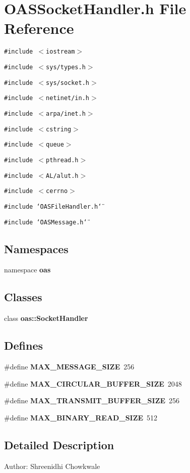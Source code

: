 \section{OASSocket\-Handler.h File Reference}
\label{OASSocketHandler_8h}
{\tt \#include $<$iostream$>$}\par
{\tt \#include $<$sys/types.h$>$}\par
{\tt \#include $<$sys/socket.h$>$}\par
{\tt \#include $<$netinet/in.h$>$}\par
{\tt \#include $<$arpa/inet.h$>$}\par
{\tt \#include $<$cstring$>$}\par
{\tt \#include $<$queue$>$}\par
{\tt \#include $<$pthread.h$>$}\par
{\tt \#include $<$AL/alut.h$>$}\par
{\tt \#include $<$cerrno$>$}\par
{\tt \#include \char`\"{}OASFile\-Handler.h\char`\"{}}\par
{\tt \#include \char`\"{}OASMessage.h\char`\"{}}\par
\subsection*{Namespaces}
\begin{CompactItemize}
\item 
namespace \textbf{oas}
\end{CompactItemize}
\subsection*{Classes}
\begin{CompactItemize}
\item 
class \bf{oas::Socket\-Handler}
\end{CompactItemize}
\subsection*{Defines}
\begin{CompactItemize}
\item 
\#define \textbf{MAX\_\-MESSAGE\_\-SIZE}~256\label{OASSocketHandler_8h_4d4da19f22ad7eb21f37f97e37cb7504}

\item 
\#define \textbf{MAX\_\-CIRCULAR\_\-BUFFER\_\-SIZE}~2048\label{OASSocketHandler_8h_9e17bb8b6db75673dcdd6b0b93107a05}

\item 
\#define \textbf{MAX\_\-TRANSMIT\_\-BUFFER\_\-SIZE}~256\label{OASSocketHandler_8h_8c88760ad44ce020e3fa24768fb2830e}

\item 
\#define \textbf{MAX\_\-BINARY\_\-READ\_\-SIZE}~512\label{OASSocketHandler_8h_6dcdeb298014a1dae7b2a09744fb5076}

\end{CompactItemize}


\subsection{Detailed Description}
\begin{Desc}
\item[Author:]Shreenidhi Chowkwale \end{Desc}

